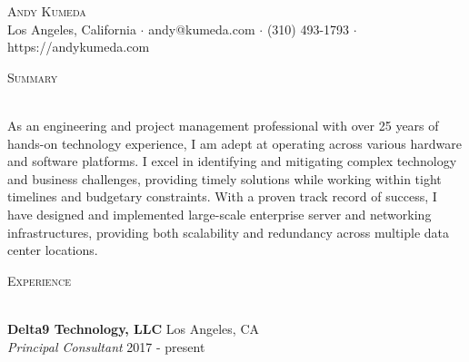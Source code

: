 \documentclass[a4paper]{article}
\newcommand{\lineunder} {
    \vspace*{-8pt} \\
    \hspace*{-18pt} \hrulefill \\
}
\newcommand{\header} [1] {
    {\hspace*{-18pt}\vspace*{6pt} \textsc{#1}}
    \vspace*{-6pt} \lineunder
}
\begin{document}
\vspace*{-15pt}

\vspace*{-10pt}
\begin{center}
	{\Huge \scshape {Andy Kumeda}}\\
	Los Angeles, California $\cdot$ andy@kumeda.com $\cdot$ (310) 493-1793 $\cdot$ https://andykumeda.com\\
\end{center}

\header{Summary}
\vspace{1mm}

As an engineering and project management professional with over 25 years of hands-on technology experience, I am adept at operating across various hardware and software platforms. I excel in identifying and mitigating complex technology and business challenges, providing timely solutions while working within tight timelines and budgetary constraints. With a proven track record of success, I have designed and implemented large-scale enterprise server and networking infrastructures, providing both scalability and redundancy across multiple data center locations.

\vspace{1mm}

\header{Experience}
\vspace{1mm}

\textbf{Delta9 Technology, LLC} \hfill Los Angeles, CA\\
\textit{Principal Consultant} \hfill 2017 - present\\
\vspace{-1mm}
\end{document}
